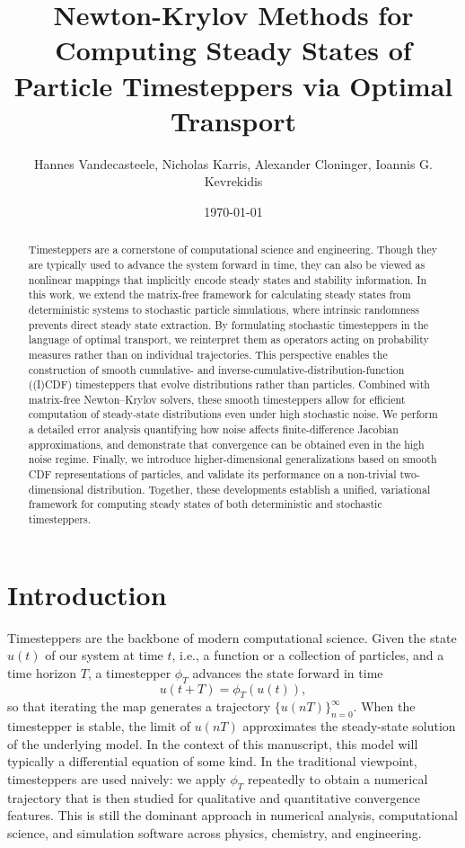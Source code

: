 \documentclass{article}
\title{Newton-Krylov Methods for Computing Steady States of Particle Timesteppers via Optimal Transport}
\author{Hannes Vandecasteele, Nicholas Karris, Alexander Cloninger, Ioannis G. Kevrekidis}
\date{\today}
\begin{document}
\maketitle

\begin{abstract}
Timesteppers are a cornerstone of computational science and engineering. Though they are typically used to advance the system forward in time, they can also be viewed as nonlinear mappings that implicitly encode steady states and stability information. In this work, we extend the matrix-free framework for calculating steady states from deterministic systems to stochastic particle simulations, where intrinsic randomness prevents direct steady state extraction. By formulating stochastic timesteppers in the language of optimal transport, we reinterpret them as operators acting on probability measures rather than on individual trajectories. This perspective enables the construction of smooth cumulative- and inverse-cumulative-distribution-function ((I)CDF) timesteppers that evolve distributions rather than particles. Combined with matrix-free Newton–Krylov solvers, these smooth timesteppers allow for efficient computation of steady-state distributions even under high stochastic noise. We perform a detailed error analysis quantifying how noise affects finite-difference Jacobian approximations, and demonstrate that convergence can be obtained even in the high noise regime. Finally, we introduce higher-dimensional generalizations based on smooth CDF representations of particles, and validate its performance on a non-trivial two-dimensional distribution. Together, these developments establish a unified, variational framework for computing steady states of both deterministic and stochastic timesteppers.
\end{abstract}

\section{Introduction}
Timesteppers are the backbone of modern computational science. Given the state $u(t)$ of our system at time $t$, i.e., a function or a collection of particles, and a time horizon $T$, a timestepper $\phi_{T}$ advances the state forward in time
\begin{equation}
    u(t+T) = \phi_{T}\left(u(t)\right),
\end{equation}
so that iterating the map generates a trajectory $\{u\left(n T\right)\}_{n=0}^\infty$. When the timestepper is stable, the limit of $u\left(nT\right)$ approximates the steady-state solution of the underlying model. In the context of this manuscript, this model will typically a differential equation of some kind. In the traditional viewpoint, timesteppers are used naively: we apply $\phi_{T}$ repeatedly to obtain a numerical trajectory that is then studied for qualitative and quantitative convergence features. This is still the dominant approach in numerical analysis, computational science, and simulation software across physics, chemistry, and engineering.
\end{document}
